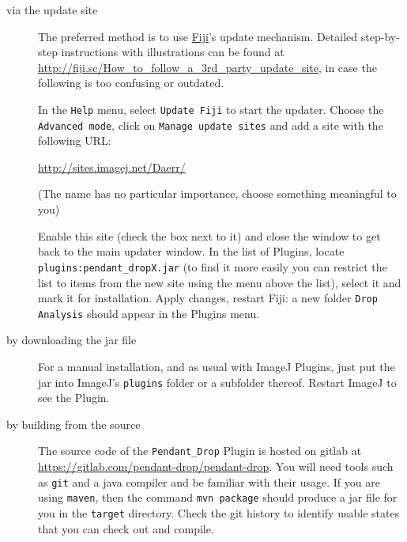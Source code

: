 \documentclass[fleqn]{scrartcl}
\newcommand{\gouttependante}{\texttt{Pendant\_Drop}\xspace}
\begin{document}
\begin{description}
\item[via the update site] The preferred method is to use
  \href{http://fiji.sc/}{Fiji}'s \cite{FijiSite,Schindelin2012}
  update mechanism. Detailed step-by-step instructions with
  illustrations can be found at
  \url{http://fiji.sc/How_to_follow_a_3rd_party_update_site}, in case
  the following is too confusing or outdated.

  In the \texttt{Help} menu, select \texttt{Update Fiji} to start the
  updater. Choose the \texttt{Advanced mode}, click on \texttt{Manage
    update sites} and add a site with the following URL:
  \begin{center}
    \url{http://sites.imagej.net/Daerr/}
  \end{center}
  (The name has no particular importance, choose something meaningful
  to you)

  Enable this site (check the box next to it) and close the window to
  get back to the main updater window. In the list of Plugins, locate
  \texttt{plugins:pendant\_dropX.jar} (to find it more easily you can
  restrict the list to items from the new site using the menu above
  the list), select it and mark it for installation. Apply changes,
  restart Fiji: a new folder \texttt{Drop Analysis} should appear
  in the Plugins menu.

\item[by downloading the jar file] For a manual installation, and as
  usual with ImageJ Plugins, just put the jar into ImageJ's
  \texttt{plugins} folder or a subfolder thereof. Restart ImageJ to
  see the Plugin.

\item[by building from the source] The source code of the
  \gouttependante Plugin is hosted on gitlab at
  \url{https://gitlab.com/pendant-drop/pendant-drop}. You will need
  tools such as \texttt{git} and a java compiler and be familiar with
  their usage. If you are using \texttt{maven}, then the command
  \texttt{mvn package} should produce a jar file for you in the
  \texttt{target} directory. Check the git history to identify usable
  states that you can check out and compile.

\end{description}
\end{document}
